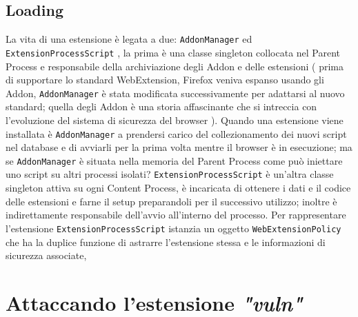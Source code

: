 \documentclass[]{./sapthesis/sapthesis}
\newcommand{\code}[1]{\texttt{#1}}
\newcommand{\vuln}{\textit{"vuln"}}
\newcommand{\AddonManager}{\code{AddonManager} }
\newcommand{\ExtensionProcessScript}{\code{ExtensionProcessScript} }
\newcommand{\WebExtensionPolicy}{\code{WebExtensionPolicy} }
\begin{document}
    \section{ Loading }
        La vita di una estensione è legata a due: \AddonManager ed \ExtensionProcessScript,
        la prima è una classe singleton collocata nel Parent Process e responsabile della archiviazione
        degli Addon e delle estensioni ( prima di supportare lo standard WebExtension, Firefox veniva espanso
        usando gli Addon, \AddonManager è stata modificata successivamente per adattarsi al nuovo standard; quella degli
        Addon è una storia affascinante che si intreccia con l'evoluzione del sistema di sicurezza del browser ).
        Quando una estensione viene installata è \AddonManager a prendersi carico del collezionamento dei nuovi
        script nel database e di avviarli per la prima volta mentre il browser è in esecuzione; ma se \AddonManager
        è situata nella memoria del Parent Process come può iniettare uno script su altri processi isolati?
        \ExtensionProcessScript è un'altra classe singleton attiva su ogni Content Process, è incaricata di
        ottenere i dati e il codice delle estensioni e farne il setup preparandoli per il successivo utilizzo;
        inoltre è indirettamente responsabile dell'avvio all'interno del processo. Per rappresentare l'estensione
        \ExtensionProcessScript istanzia un oggetto \WebExtensionPolicy che ha la duplice funzione di astrarre
        l'estensione stessa e le informazioni di sicurezza associate, 
         

\newpage

\chapter{Attaccando l'estensione \vuln}
\end{document}
